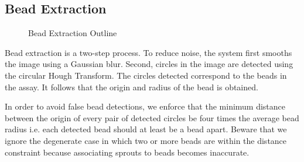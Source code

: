 \documentclass{sig-alternate}
\begin{document}
	\subsection{Bead Extraction} %
	\label{sub:Bead Extraction}
		\begin{figure}[htp!]
			\centering
			\caption{Bead Extraction Outline}
			\label{fig:beadex}
		\end{figure}
		Bead extraction is a two-step process. To reduce noise, the system
		first smooths the image using a Gaussian blur. Second, circles in
		the image are detected using the circular Hough Transform. The
		circles detected correspond to the beads in the assay. It follows that
		the origin and radius of the bead is obtained.

		In order to avoid false bead detections, we enforce that the minimum
		distance between the origin of every pair of detected circles be four
		times the average bead radius i.e. each detected bead should at least
		be a bead apart. Beware that we ignore the degenerate case in which two
		or more beads are within the distance constraint because associating
		sprouts to beads becomes inaccurate.
\end{document}
